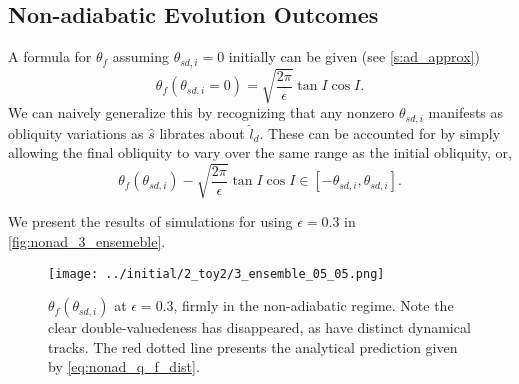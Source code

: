 \documentclass[
        fleqn,
        usenatbib,
        referee,
    ]{mnras}
\newcommand*{\p}[1]{\left(#1\right)}
\newcommand*{\s}[1]{\left[#1\right]}
\begin{document}
\subsection{Non-adiabatic Evolution Outcomes}

A formula for $\theta_{f}$ assuming $\theta_{sd, i} = 0$ initially can be
given (see \autoref{s:ad_approx})
\begin{equation}
    \theta_{f}\p{\theta_{sd, i} = 0} = \sqrt{\frac{2\pi}{\epsilon}}
        \tan I\cos I.\label{eq:nonad_q_f}
\end{equation}
We can naively generalize this by recognizing that any nonzero $\theta_{sd, i}$
manifests as obliquity variations as $\hat{s}$ librates about $\hat{l}_d$. These
can be accounted for by simply allowing the final obliquity to vary over the
same range as the initial obliquity, or,
\begin{equation}
    \theta_{f}\p{\theta_{sd, i}} - \sqrt{\frac{2\pi}{\epsilon}}
        \tan I\cos I\in \s{-\theta_{sd, i}, \theta_{sd,i}}
        .\label{eq:nonad_q_f_dist}
\end{equation}

We present the results of simulations for using $\epsilon = 0.3$ in
\autoref{fig:nonad_3_ensemeble}.
\begin{figure}
    \centering
    \texttt{[image: ../initial/2\_toy2/3\_ensemble\_05\_05.png]}
    \caption{$\theta_{ f}\p{\theta_{sd, i}}$ at $\epsilon = 0.3$, firmly in
    the non-adiabatic regime. Note the clear double-valuedeness has disappeared,
    as have distinct dynamical tracks. The red dotted line presents the
    analytical prediction given by
    \autoref{eq:nonad_q_f_dist}.}\label{fig:nonad_3_ensemeble}
\end{figure}
\end{document}
